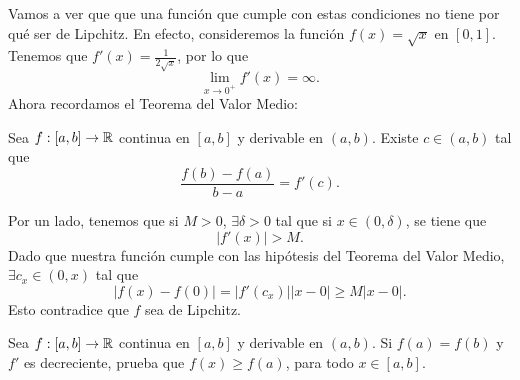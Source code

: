 \documentclass{article}
\begin{document}
\begin{sol}
	Vamos a ver que que una función que cumple con estas condiciones no tiene por qué ser de Lipchitz. En efecto, consideremos la función $\displaystyle f\left(x\right) = \sqrt{x} $ en $\displaystyle \left[0,1\right]  $. Tenemos que $\displaystyle f'\left(x\right) = \frac{1}{2\sqrt{x}} $, por lo que 
	\[\lim_{x \to 0^{+}}f'\left(x\right) = \infty .\]
Ahora recordamos el Teorema del Valor Medio:
\begin{theorem}
	Sea $\displaystyle f : \left[a,b\right] \to \mathbb{R} $ continua en $\displaystyle \left[a,b\right]  $ y derivable en $\displaystyle \left(a,b\right) $. Existe $\displaystyle c \in \left(a,b\right) $ tal que 
	\[\frac{f\left(b\right)-f\left(a\right)}{b-a} = f'\left(c\right) .\]
\end{theorem}
Por un lado, tenemos que si $\displaystyle M > 0$, $\displaystyle \exists \delta > 0 $ tal que si $\displaystyle x \in \left(0, \delta \right) $, se tiene que 
\[ \left|f'\left(x\right)\right| > M .\]
Dado que nuestra función cumple con las hipótesis del Teorema del Valor Medio, $\displaystyle \exists c_{x} \in \left(0,x\right) $ tal que 
\[ \left|f\left(x\right)-f\left(0\right)\right| = \left|f'\left(c_{x}\right)\right| \left|x - 0\right| \geq M \left|x-0\right| .\]
Esto contradice que $\displaystyle f $ sea de Lipchitz. 
\end{sol}
\begin{ej}
	Sea $\displaystyle f : \left[a,b\right] \to \mathbb{R} $ continua en $\displaystyle \left[a,b\right]  $ y derivable en $\displaystyle \left(a,b\right) $. Si $\displaystyle f\left(a\right) = f\left(b\right) $ y $\displaystyle f' $ es decreciente, prueba que $\displaystyle f\left(x\right) \geq f\left(a\right) $, para todo $\displaystyle x \in \left[a,b\right]  $.
\end{ej}
\end{document}
